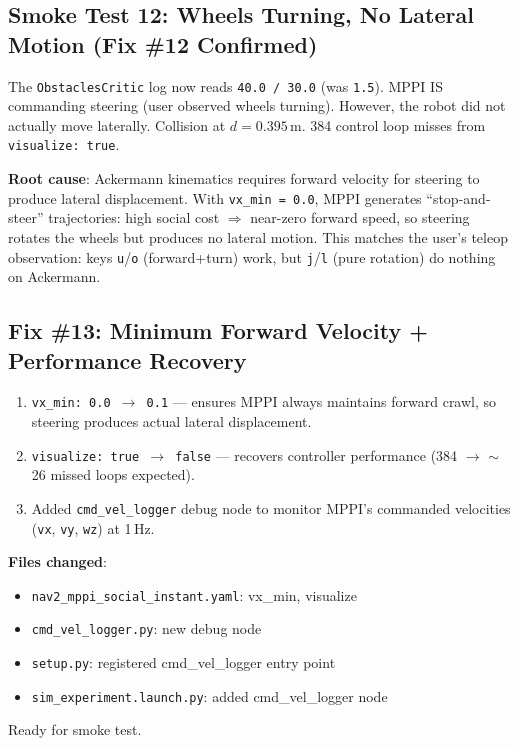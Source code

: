 \documentclass[11pt]{article}
\newcommand{\logentry}[1]{\subsection*{#1}}
\begin{document}
\logentry{Smoke Test 12: Wheels Turning, No Lateral Motion (Fix \#12 Confirmed)}
The \texttt{ObstaclesCritic} log now reads \texttt{40.0 / 30.0} (was \texttt{1.5}).
MPPI IS commanding steering (user observed wheels turning). However, the robot did
not actually move laterally. Collision at $d = 0.395$\,m. 384 control loop misses from
\texttt{visualize: true}.

\textbf{Root cause}: Ackermann kinematics requires forward velocity for steering to
produce lateral displacement. With \texttt{vx\_min = 0.0}, MPPI generates
``stop-and-steer'' trajectories: high social cost $\Rightarrow$ near-zero forward
speed, so steering rotates the wheels but produces no lateral motion. This matches
the user's teleop observation: keys \texttt{u}/\texttt{o} (forward+turn) work, but
\texttt{j}/\texttt{l} (pure rotation) do nothing on Ackermann.

\logentry{Fix \#13: Minimum Forward Velocity + Performance Recovery}
\begin{enumerate}
  \item \texttt{vx\_min: 0.0 $\to$ 0.1} --- ensures MPPI always maintains forward
        crawl, so steering produces actual lateral displacement.
  \item \texttt{visualize: true $\to$ false} --- recovers controller performance
        (384 $\to$ $\sim$26 missed loops expected).
  \item Added \texttt{cmd\_vel\_logger} debug node to monitor MPPI's commanded
        velocities (\texttt{vx}, \texttt{vy}, \texttt{wz}) at 1\,Hz.
\end{enumerate}

\textbf{Files changed}:
\begin{itemize}
  \item \texttt{nav2\_mppi\_social\_instant.yaml}: vx\_min, visualize
  \item \texttt{cmd\_vel\_logger.py}: new debug node
  \item \texttt{setup.py}: registered cmd\_vel\_logger entry point
  \item \texttt{sim\_experiment.launch.py}: added cmd\_vel\_logger node
\end{itemize}

Ready for smoke test.

\end{document}
